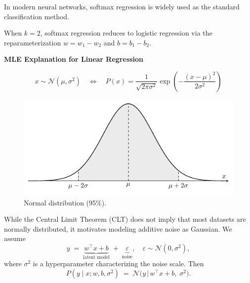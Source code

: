 \documentclass[../main]{subfiles}
\begin{document}
\begin{note}
  In modern neural networks, softmax regression is widely used 
  as the standard classification method.
\end{note}

\begin{remark}
  When $k=2$, softmax regression reduces to logistic regression 
  via the reparameterization $w = w_1 - w_2$ and $b = b_1 - b_2$.
\end{remark}
\begin{example}
  \textbf{MLE Explanation for Linear Regression}
\end{example}
\begin{definition}
    \begin{equation}
        x\sim\mathcal N(\mu,\sigma^2)\quad\Leftrightarrow\quad P(x)=\frac{1}{\sqrt{2\pi\sigma^2}}\exp\left(-\frac{(x-\mu)^2}{2\sigma^2}\right)
    \end{equation}
\end{definition}
\begin{figure}[H]
  \centering
  \includegraphics{../../tikz/2/3.pdf}
  \caption{Normal distribution (95\%).}
  \label{2-lr}
\end{figure}
While the Central Limit Theorem (CLT) does not imply that most datasets are normally distributed, 
it motivates modeling additive noise as Gaussian. We assume
\begin{equation}
  y \;=\;
  \underbrace{w^\top x + b}_{\text{latent model}}
  \;+\;
  \underbrace{\varepsilon}_{\text{noise}}, 
  \quad \varepsilon \sim \mathcal N(0,\sigma^2),
\end{equation}
where $\sigma^2$ is a hyperparameter characterizing the noise scale. Then
\begin{equation}
  P(y \mid x; w,b,\sigma^2) \;=\; \mathcal N\!\big(y \,\big|\, w^\top x + b,\; \sigma^2\big).
\end{equation}
\end{document}
